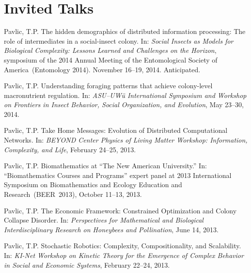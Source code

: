 \section{Invited Talks}

\begin{bibenum}

    \item Pavlic, T.P.
        The hidden demographics of distributed information processing:
        The role of intermediates in a social-insect colony. In:
        \emph{Social Insects as Models for Biological Complexity:
        Lessons Learned and Challenges on the Horizon}, symposium of the
        2014 Annual Meeting of the Entomological Society of
        America~(Entomology 2014). November 16--19, 2014. Anticipated.

    \item Pavlic, T.P. Understanding foraging patterns that achieve
        colony-level macronutrient regulation. In: \emph{ASU--UW\"{u}
        International Symposium and Workshop on Frontiers in Insect
        Behavior, Social Organization, and Evolution}, May 23--30, 2014.

    \item Pavlic, T.P. Take Home Messages: Evolution of Distributed
        Computational Networks. In: \emph{BEYOND Center Physics of
        Living Matter Workshop: Information, Complexity, and Life},
        February 24--25, 2013.

    \item Pavlic, T.P. Biomathematics at ``The New American
        University.'' In: ``Biomathematics Courses and Programs'' expert
        panel at 2013 International Symposium on Biomathematics and
        Ecology Education and Research~(BEER~2013),
        October 11--13, 2013.

    \item Pavlic, T.P. The Economic Framework: Constrained Optimization
        and Colony Collapse Disorder. In: \emph{Perspectives for
        Mathematical and Biological Interdisciplinary Research on
        Honeybees and Pollination}, June 14, 2013.

    \item Pavlic, T.P. Stochastic Robotics: Complexity,
        Compositionality, and Scalability. In: \emph{KI-Net Workshop on
        Kinetic Theory for the Emergence of Complex Behavior in Social
        and Economic Systems}, February 22--24, 2013.

\end{bibenum}